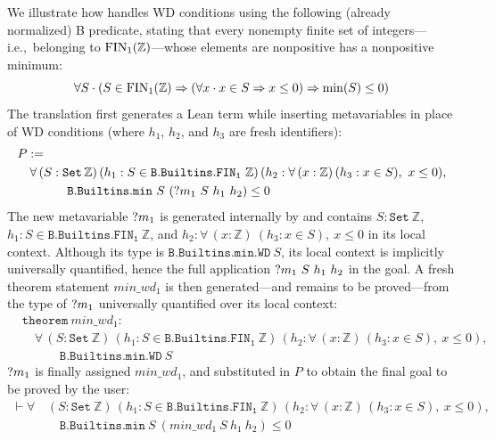 \begin{example}
	We illustrate how \barrel handles WD conditions using the following (already normalized) B predicate, stating that every nonempty finite set of integers---i.e.,\ belonging to $\operatorname{FIN}_1({\mathbb{Z}})$---whose elements are nonpositive has a nonpositive minimum: \[
		\forall S \cdot (S \in \operatorname{FIN}_1({\mathbb{Z}}) \Rightarrow (\forall x \cdot x \in S \Rightarrow x \le 0) \Rightarrow \operatorname{min}(S) \le 0)
	\]
	The translation first generates a Lean term while inserting metavariables in place of WD conditions (where $h_1$, $h_2$, and $h_3$ are fresh identifiers):
	\[
		\begin{split}
			 & P :=                                                                                                                                                                    \\
			 & \quad \forall\, (S : \mathtt{Set}\, \mathbb{Z})\, (h_1 : S \in \mathtt{B.Builtins.FIN_1}\ \mathbb{Z})\, (h_2 : \forall\, (x : \mathbb{Z})\, (h_3 : x \in S),\ x \le 0), \\
			 & \qquad\qquad \mathtt{B.Builtins.min}\ S\ (\metavar{m_1}\ S\ h_1\ h_2) \le 0
		\end{split}
	\]
	The new metavariable $?{m_1}$ is generated internally by \barrel and contains $S : \mathtt{Set}\ \mathbb{Z}$, $h_1 : S \in \mathtt{B.Builtins.FIN_1}\ \mathbb{Z}$, and $h_2 : \forall\, (x : \mathbb{Z})\ (h_3 : x \in S),\ x \le 0$ in its local context.
	Although its type is $\mathtt{B.Builtins.min.WD}\ S$, its local context is implicitly universally quantified, hence the full application $\metavar{m_1}\ S\ h_1\ h_2$ in the goal.
	A fresh theorem statement $min\_wd_1$ is then generated---and remains to be proved---from the type of $?{m_1}$ universally quantified over its local context: \[
		\begin{split}
			 & \mathtt{theorem}\ min\_wd_1 :                                                                                                                                          \\
			 & \quad \forall\, (S : \mathtt{Set}\ \mathbb{Z})\, (h_1 : S \in \mathtt{B.Builtins.FIN_1}\ \mathbb{Z})\, (h_2 : \forall\, (x : \mathbb{Z})\, (h_3 : x \in S),\ x \le 0), \\
			 & \qquad\quad \mathtt{B.Builtins.min.WD}\ S
		\end{split}
	\]
	$?{m_1}$ is finally assigned $min\_wd_1$, and substituted in $P$ to obtain the final goal to be proved by the user: \[
		\begin{split}
			\vdash \forall\, & (S : \mathtt{Set}\ \mathbb{Z})\, (h_1 : S \in \mathtt{B.Builtins.FIN_1}\ \mathbb{Z})\, (h_2 : \forall\, (x : \mathbb{Z})\, (h_3 : x \in S),\ x \le 0), \\
			                 & \quad \mathtt{B.Builtins.min}\ S\ (min\_wd_1\ S\ h_1\ h_2) \le 0
		\end{split}
	\]
\end{example}

